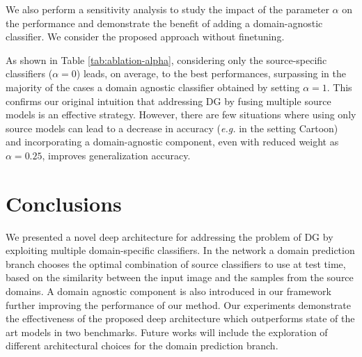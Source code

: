 \documentclass{article}
\begin{document}
We also perform a sensitivity analysis to study the impact of the parameter $\alpha$ on the performance and demonstrate the benefit of adding a domain-agnostic classifier. We consider the proposed approach without finetuning.
\begin{table}[t]
			\caption{PACS dataset: sensitivity analysis. } 
		\centering
		\label{tab:ablation-alpha}
    \vspace{-0.5cm}
\end{table}
As shown in Table \ref{tab:ablation-alpha}, considering only the source-specific classifiers ($\alpha=0$) leads, on average, to the best performances, surpassing in the majority of the cases a domain agnostic classifier obtained by setting $\alpha=1$. This confirms our original intuition that addressing DG by fusing multiple source models is an effective strategy. However, there are few situations where using only source models can lead to a decrease in accuracy (\textit{e.g.} in the setting Cartoon) and incorporating a domain-agnostic component, even with reduced weight as $\alpha=0.25$, improves generalization accuracy.  



\vspace{-0.3cm}
\section{Conclusions}
\vspace{-0.3cm}
We presented a novel deep architecture for addressing the problem of DG by exploiting multiple domain-specific classifiers. In the network a domain prediction branch chooses the optimal combination of source classifiers to use at test time, based on the similarity between the input image and the samples from the source domains. A domain agnostic component is also introduced in our framework further improving the performance of our method. Our experiments demonstrate the effectiveness of the proposed deep architecture which outperforms state of the art models in two benchmarks. Future works will include the exploration of different architectural choices for the domain prediction branch.





\end{document}
